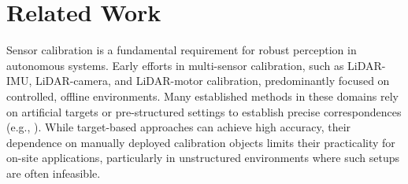 \section{Related Work}

Sensor calibration is a fundamental requirement for robust perception in autonomous systems. Early efforts in multi-sensor calibration, such as LiDAR-IMU, LiDAR-camera, and LiDAR-motor calibration, predominantly focused on controlled, offline environments. Many established methods in these domains rely on artificial targets or pre-structured settings to establish precise correspondences (e.g., \cite{cui2020, dhall2017,gao2019calibration}). While target-based approaches can achieve high accuracy, their dependence on manually deployed calibration objects limits their practicality for on-site applications, particularly in unstructured environments where such setups are often infeasible.

